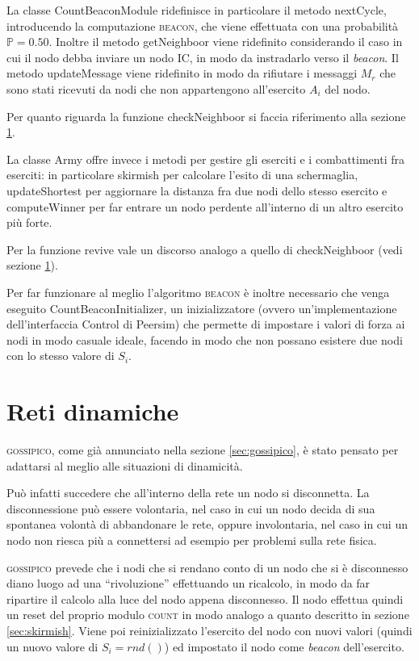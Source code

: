 \documentclass[a4paper,12pt]{article}
\begin{document}
La classe \textsf{CountBeaconModule} ridefinisce in particolare il metodo \textsf{nextCycle}, introducendo la computazione \textsc{beacon}, che viene effettuata con una probabilit\`a $\mathbb{P} = 0.50$. Inoltre il metodo \textsf{getNeighboor} viene ridefinito considerando il caso in cui il nodo debba inviare un nodo IC, in modo da instradarlo verso il \emph{beacon}. Il metodo \textsf{updateMessage} viene ridefinito in modo da rifiutare i messaggi $M_r$ che sono stati ricevuti da nodi che non appartengono all'esercito $A_i$ del nodo.

Per quanto riguarda la funzione \textsf{checkNeighboor} si faccia riferimento alla sezione \ref{sec:dynamic}.

La classe \textsf{Army} offre invece i metodi per gestire gli eserciti e i combattimenti fra eserciti: in particolare \textsf{skirmish} per calcolare l'esito di una schermaglia, \textsf{updateShortest} per aggiornare la distanza fra due nodi dello stesso esercito e \textsf{computeWinner} per far entrare un nodo perdente all'interno di un altro esercito pi\`u forte.

Per la funzione \textsf{revive} vale un discorso analogo a quello di \textsf{checkNeighboor} (vedi sezione \ref{sec:dynamic}).

Per far funzionare al meglio l'algoritmo \textsc{beacon} \`e inoltre necessario che venga eseguito \textsf{CountBeaconInitializer}, un inizializzatore (ovvero un'implementazione dell'interfaccia \textsf{Control} di Peersim) che permette di impostare i valori di forza ai nodi in modo casuale ideale, facendo in modo che non possano esistere due nodi con lo stesso valore di $S_i$.

\section{Reti dinamiche}
\label{sec:dynamic}

\textsc{gossipico}, come gi\`a annunciato nella sezione \ref{sec:gossipico}, \`e stato pensato per adattarsi al meglio alle situazioni di dinamicit\`a.

Pu\`o infatti succedere che all'interno della rete un nodo si disconnetta. La disconnessione pu\`o essere volontaria, nel caso in cui un nodo decida di sua spontanea volont\`a di abbandonare le rete, oppure involontaria, nel caso in cui un nodo non riesca pi\`u a connettersi ad esempio per problemi sulla rete fisica.

\textsc{gossipico} prevede che i nodi che si rendano conto di un nodo che si \`e disconnesso diano luogo ad una ``rivoluzione'' effettuando un ricalcolo, in modo da far ripartire il calcolo alla luce del nodo appena disconnesso. Il nodo effettua quindi un reset del proprio modulo \textsc{count} in modo analogo a quanto descritto in sezione \ref{sec:skirmish}. Viene poi reinizializzato l'esercito del nodo con nuovi valori (quindi un nuovo valore di $S_i = rnd()$) ed impostato il nodo come \emph{beacon} dell'esercito.
\end{document}
